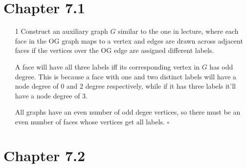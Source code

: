 \documentclass[12pt]{article}
\begin{document}
\section{Chapter 7.1}

\begin{enumerate}
    \item[1] Construct an auxiliary graph $G$ similar to the one in lecture,
        where each face in the OG graph maps to a vertex and edges are
        drawn across adjacent faces if the vertices over the OG edge are assigned different labels.

        A face will have all three labels iff its corresponding vertex in $G$
        has odd degree.
        This is because a face with one and two distinct labels will have a node degree of $0$
        and $2$ degree respectively, while if it has three labels it'll have a node degree of $3$.

        All graphs have an even number of odd degee vertices,
        so there must be an even number of faces whose vertices get all labels. $\square$
\end{enumerate}

\section{Chapter 7.2}
\end{document}
